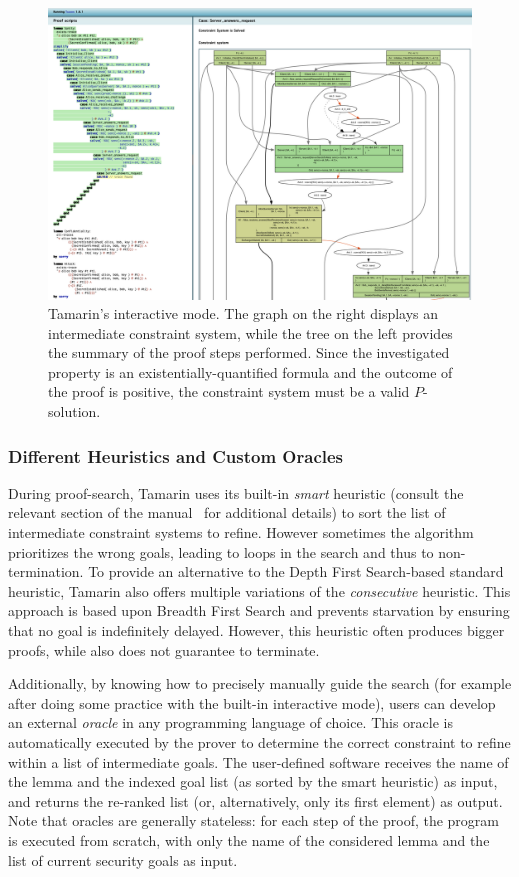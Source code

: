 \begin{figure}
    \centering
    \includegraphics[width=1\textwidth]{Figures/tamaringui.png}
    \caption{Tamarin's interactive mode. The graph on the right displays an intermediate constraint system, while the tree on the left provides the summary of the proof steps performed. Since the investigated property is an existentially-quantified formula and the outcome of the proof is positive, the constraint system must be a valid $P$-solution.}
    \label{fig:interactive}
\end{figure}

\subsubsection{Different Heuristics and Custom Oracles}

During proof-search, Tamarin uses its built-in \textit{smart} heuristic (consult the relevant section of the manual~\cite{tamarinManual} for additional details) to sort the list of intermediate constraint systems to refine. However sometimes the algorithm prioritizes the wrong goals, leading to loops in the search and thus to non-termination. To provide an alternative to the Depth First Search-based standard heuristic, Tamarin also offers multiple variations of the \textit{consecutive} heuristic. This approach is based upon Breadth First Search and prevents starvation by ensuring that no goal is indefinitely delayed. However, this heuristic often produces bigger proofs, while also does not guarantee to terminate.

Additionally, by knowing how to precisely manually guide the search (for example after doing some practice with the built-in interactive mode), users can develop an external \textit{oracle} in any programming language of choice. This oracle is automatically executed by the prover to determine the correct constraint to refine within a list of intermediate goals. The user-defined software receives the name of the lemma and the indexed goal list (as sorted by the smart heuristic) as input, and returns the re-ranked list (or, alternatively, only its first element) as output. Note that oracles are generally stateless: for each step of the proof, the program is executed from scratch, with only the name of the considered lemma and the list of current security goals as input.

